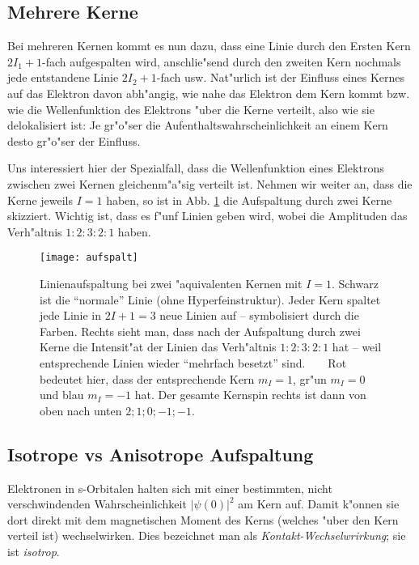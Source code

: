 \documentclass[a4paper,12pt]{article}
\begin{document}
\subsection{Mehrere Kerne}
\label{sec:mehrere_kerne}

Bei mehreren Kernen kommt es nun dazu, dass eine Linie durch den
Ersten Kern $2I_1+1$-fach aufgespalten wird, anschlie"send durch den
zweiten Kern nochmals jede entstandene Linie $2I_2+1$-fach
usw. Nat"urlich ist der Einfluss eines Kernes auf das Elektron davon
abh"angig, wie nahe das Elektron dem Kern kommt bzw. wie die
Wellenfunktion des Elektrons "uber die Kerne verteilt, also wie sie
delokalisiert ist: Je gr"o"ser die Aufenthaltswahrscheinlichkeit an
einem Kern desto gr"o"ser der Einfluss.

Uns interessiert hier der Spezialfall, dass die Wellenfunktion eines Elektrons zwischen zwei Kernen gleichenm"a"sig verteilt ist. Nehmen wir weiter an, dass die
Kerne jeweils $I = 1$ haben, so ist in Abb. \ref{fig:aufspaltung} die
Aufspaltung durch zwei Kerne skizziert. Wichtig ist, dass es
f"unf Linien geben wird, wobei die Amplituden das Verh"altnis
$1:2:3:2:1$ haben.


\begin{figure}[!h]
  \centering
  \texttt{[image: aufspalt]}
  \caption{Linienaufspaltung bei zwei "aquivalenten Kernen mit
    $I=1$. Schwarz ist die "`normale"' Linie (ohne
    Hyperfeinstruktur). Jeder Kern spaltet jede Linie in $2I+1=3$ neue
    Linien auf -- symbolisiert durch die Farben. Rechts sieht man,
    dass nach der Aufspaltung durch zwei Kerne die Intensit"at der
    Linien das Verh"altnis $1:2:3:2:1$ hat -- weil entsprechende
    Linien wieder "`mehrfach besetzt"' sind. ~ ~
    Rot bedeutet hier, dass der entsprechende Kern $m_I = 1$, gr"un $m_I = 0$
    und blau $m_I = -1$ hat. Der gesamte Kernspin rechts ist dann von oben nach
    unten $2; 1; 0; -1; -1$.}
  \label{fig:aufspaltung}
\end{figure}



\subsection{Isotrope vs Anisotrope Aufspaltung}
\label{sec:isotrope_vs_anisotrope_aufspaltung}


Elektronen in s-Orbitalen halten sich mit einer bestimmten, nicht
verschwindenden Wahrscheinlichkeit $ | \psi(0) |^2 $ am Kern
auf. Damit k"onnen sie dort direkt mit dem magnetischen Moment des
Kerns (welches "uber den Kern verteil ist) wechselwirken. Dies
bezeichnet man als \emph{Kontakt-Wechselwrirkung}; sie ist \emph{isotrop}.
\end{document}
